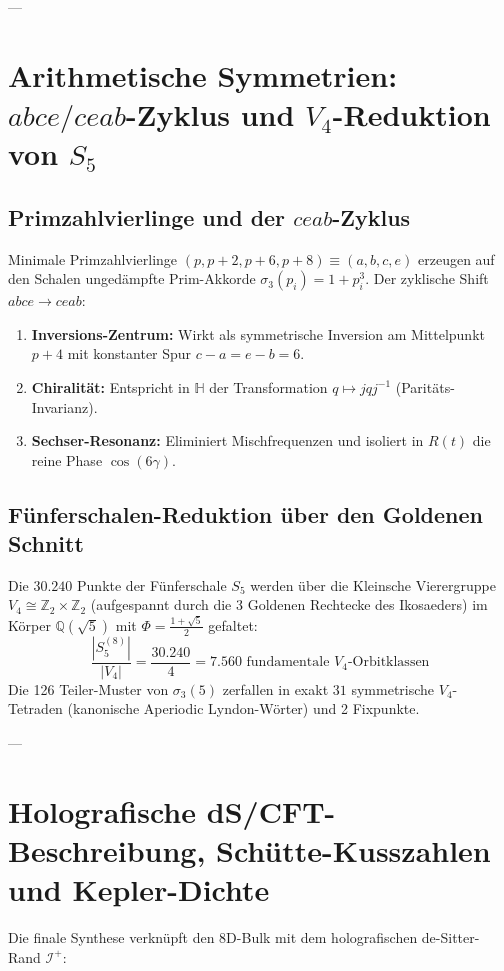 \documentclass[11pt,a4paper]{article}
\begin{document}
	---
	
	\section{Arithmetische Symmetrien: $abce/ceab$-Zyklus und $V_4$-Reduktion von $S_5$}
	
	\subsection{Primzahlvierlinge und der $ceab$-Zyklus}
	Minimale Primzahlvierlinge $(p, p+2, p+6, p+8) \equiv (a, b, c, e)$ erzeugen auf den Schalen ungedämpfte Prim-Akkorde $\sigma_3(p_i) = 1 + p_i^3$. Der zyklische Shift $abce \to ceab$:
	\begin{enumerate}
		\item \textbf{Inversions-Zentrum:} Wirkt als symmetrische Inversion am Mittelpunkt $p+4$ mit konstanter Spur $c-a = e-b = 6$.
		\item \textbf{Chiralität:} Entspricht in $\mathbb{H}$ der Transformation $q \mapsto j q j^{-1}$ (Paritäts-Invarianz).
		\item \textbf{Sechser-Resonanz:} Eliminiert Mischfrequenzen und isoliert in $R(t)$ die reine Phase $\cos(6\gamma)$.
	\end{enumerate}
	
	\subsection{Fünferschalen-Reduktion über den Goldenen Schnitt}
	Die $30.240$ Punkte der Fünferschale $S_5$ werden über die Kleinsche Vierergruppe $V_4 \cong \mathbb{Z}_2 \times \mathbb{Z}_2$ (aufgespannt durch die 3 Goldenen Rechtecke des Ikosaeders) im Körper $\mathbb{Q}(\sqrt{5})$ mit $\Phi = \frac{1+\sqrt{5}}{2}$ gefaltet:
	$$\frac{|S_5^{(8)}|}{|V_4|} = \frac{30.240}{4} = 7.560 \text{ fundamentale $V_4$-Orbitklassen}$$
	Die 126 Teiler-Muster von $\sigma_3(5)$ zerfallen in exakt $31$ symmetrische $V_4$-Tetraden (kanonische Aperiodic Lyndon-Wörter) und 2 Fixpunkte.
	
	---
	
	\section{Holografische dS/CFT-Beschreibung, Schütte-Kusszahlen und Kepler-Dichte}
	
	Die finale Synthese verknüpft den $8\text{D}$-Bulk mit dem holografischen de-Sitter-Rand $\mathcal{I}^+$:
	
\end{document}
